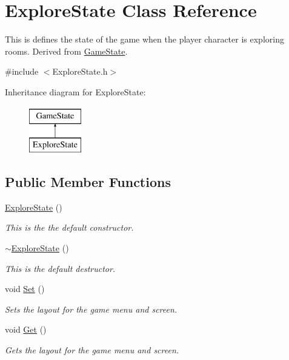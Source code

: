 \hypertarget{classExploreState}{\section{Explore\-State Class Reference}
\label{classExploreState}
}


This is defines the state of the game when the player character is exploring rooms. Derived from \hyperlink{classGameState}{Game\-State}.  




{\ttfamily \#include $<$Explore\-State.\-h$>$}

Inheritance diagram for Explore\-State\-:\begin{figure}[H]
\begin{center}
\leavevmode
\includegraphics[height=2.000000cm]{classExploreState}
\end{center}
\end{figure}
\subsection*{Public Member Functions}
\begin{DoxyCompactItemize}
\item 
\hyperlink{classExploreState_ac10ad3cee219e8233a2c279392b70d52}{Explore\-State} ()
\begin{DoxyCompactList}\small\item\em This is the the default constructor. \end{DoxyCompactList}\item 
\hyperlink{classExploreState_a713fbeb296e929346e07ffe63c1af580}{$\sim$\-Explore\-State} ()
\begin{DoxyCompactList}\small\item\em This is the default destructor. \end{DoxyCompactList}\item 
void \hyperlink{classExploreState_a8fb38f9fca513b87d914d077a0f2652b}{Set} ()
\begin{DoxyCompactList}\small\item\em Sets the layout for the game menu and screen. \end{DoxyCompactList}\item 
void \hyperlink{classExploreState_ace76d7a24bcb85f6f0a0fe0d0e763e21}{Get} ()
\begin{DoxyCompactList}\small\item\em Gets the layout for the game menu and screen. \end{DoxyCompactList}\end{DoxyCompactItemize}
